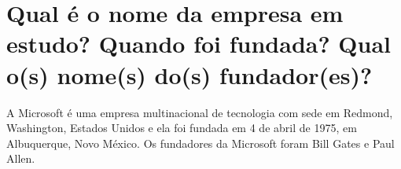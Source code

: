 \section{Qual é o nome da empresa em estudo? Quando foi fundada? Qual o(s) nome(s) do(s) fundador(es)?}

A Microsoft é uma empresa multinacional de tecnologia com sede em Redmond, Washington, Estados Unidos e ela foi fundada em 4 de abril de 1975, em Albuquerque, Novo México. Os fundadores da Microsoft foram Bill Gates e Paul Allen.